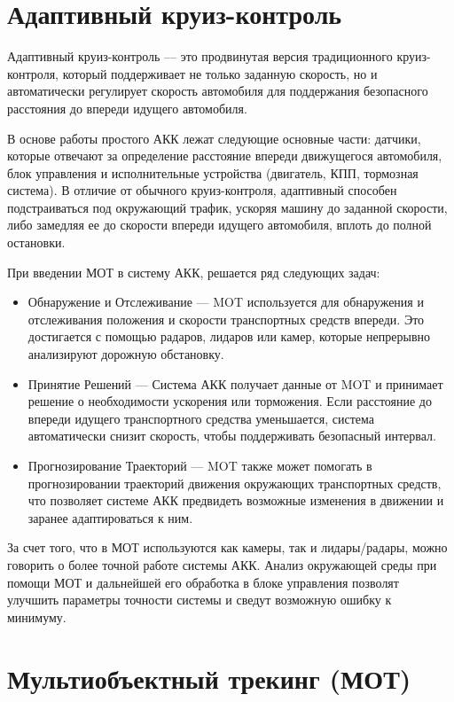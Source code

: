 \chapter{Адаптивный круиз-контроль}
Адаптивный круиз-контроль --- это продвинутая версия традиционного круиз-контроля, который поддерживает не только заданную скорость, но и автоматически регулирует скорость автомобиля для поддержания безопасного расстояния до впереди идущего автомобиля.

В основе работы простого АКК лежат следующие основные части: датчики, которые отвечают за определение расстояние впереди движущегося автомобиля, блок управления и исполнительные устройства (двигатель, КПП, тормозная система). В отличие от обычного круиз-контроля, адаптивный способен подстраиваться под окружающий трафик, ускоряя машину до заданной скорости, либо замедляя ее до скорости впереди идущего автомобиля, вплоть до полной остановки.

При введении МОТ в систему АКК, решается ряд следующих задач:

\begin{itemize}

	\item Обнаружение и Отслеживание --- MOT используется для обнаружения и отслеживания положения и скорости транспортных средств впереди. Это достигается с помощью радаров, лидаров или камер, которые непрерывно анализируют дорожную обстановку.

	\item Принятие Решений --- Система АКК получает данные от MOT и принимает решение о необходимости ускорения или торможения. Если расстояние до впереди идущего транспортного средства уменьшается, система автоматически снизит скорость, чтобы поддерживать безопасный интервал.

	\item Прогнозирование Траекторий --- MOT также может помогать в прогнозировании траекторий движения окружающих транспортных средств, что позволяет системе АКК предвидеть возможные изменения в движении и заранее адаптироваться к ним.

\end{itemize}

За счет того, что в МОТ используются как камеры, так и лидары/радары, можно говорить о более точной работе системы АКК. Анализ окружающей среды при помощи МОТ и дальнейшей его обработка в блоке управления позволят улучшить параметры точности системы и сведут возможную ошибку к минимуму.  

\chapter{Мультиобъектный трекинг (МОТ)}

